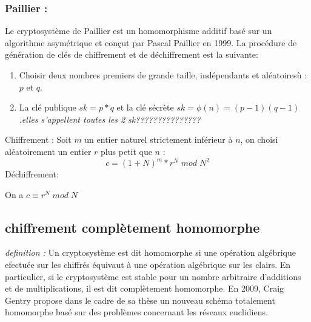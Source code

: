 \documentclass[a4paper,11pt]{report}
\begin{document}
\subsubsection{Paillier : }

Le cryptosystème de Paillier est un homomorphisme additif basé sur un algorithme asymétrique et conçut par Pascal Paillier en 1999.\newline
La procédure de génération de clés de chiffrement et de déchiffrement est la suivante:
\begin{enumerate}
\item Choisir deux nombres premiers de grande taille, indépendants et aléatoiresù : $p$   et $q$.
\item La clé publique $sk = p*q$ et la clé sécrète $sk = \phi(n) = (p - 1)(q -1)$.\textit{elles s'appellent toutes les 2 sk???????????????}
\end{enumerate}
Chiffrement :\newline
Soit $m$ un entier naturel strictement inférieur à $n$, on choisi aléatoirement un entier $r$ plus petit que $n$ :\newline
$$c = (1+N)^m * r^N\;mod\; N^2$$
Déchiffrement:\newline

On a $c \equiv r^N\;mod\; N$
\subsection{chiffrement complètement homomorphe}
\textit{definition :}
Un cryptosystème est dit homomorphe si une opération algébrique efectuée sur les chiffrés équivaut à une opération algébrique sur les clairs. En particulier, si le cryptosystème est stable pour un nombre arbitraire d'additions et de multiplications, il est dit complètement homomorphe.\newline
En 2009, Craig Gentry propose dans le cadre de sa thèse un nouveau schéma totalement homomorphe basé sur des problèmes concernant les réseaux euclidiens.
\end{document}
